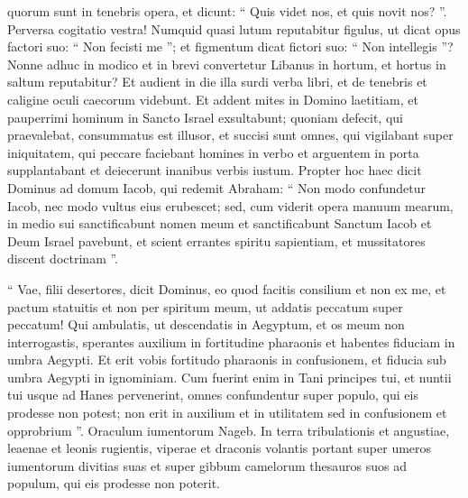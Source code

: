 \begin{biblechapter}
\begin{biblechapter}
\begin{biblechapter}
\begin{biblechapter}
\begin{biblechapter}
\begin{biblechapter}
\begin{biblechapter}
\begin{biblechapter}
\begin{biblechapter}
\begin{biblechapter}
\begin{biblechapter}
\begin{biblechapter}
\begin{biblechapter}
\begin{biblechapter}
\begin{biblechapter}
\begin{biblechapter}
\begin{biblechapter}
\begin{biblechapter}
\begin{biblechapter}
\begin{biblechapter}
\begin{biblechapter}
\begin{biblechapter}
\begin{biblechapter}
\begin{biblechapter}
\begin{biblechapter}
\begin{biblechapter}
\begin{biblechapter}
\begin{biblechapter}
\begin{biblechapter}
 quorum sunt in tenebris opera, et dicunt:
 “ Quis videt nos, et quis novit nos? ”.
 \verse Perversa cogitatio vestra!
 Numquid quasi lutum reputabitur figulus,
 ut dicat opus factori suo:
 “ Non fecisti me ”;
 et figmentum dicat fictori suo:
 “ Non intellegis ”?
 \verse Nonne adhuc in modico et in brevi convertetur Libanus in hortum,
 et hortus in saltum reputabitur?
 \verse Et audient in die illa surdi verba libri,
 et de tenebris et caligine oculi caecorum videbunt.
 \verse Et addent mites in Domino laetitiam,
 et pauperrimi hominum in Sancto Israel exsultabunt;
 \verse quoniam defecit, qui praevalebat,
 consummatus est illusor,
 et succisi sunt omnes, qui vigilabant super iniquitatem,
 \verse qui peccare faciebant homines in verbo
 et arguentem in porta supplantabant
 et deiecerunt inanibus verbis iustum.
 \verse Propter hoc haec dicit Dominus
 ad domum Iacob, qui redemit Abraham:
 “ Non modo confundetur Iacob,
 nec modo vultus eius erubescet;
 \verse sed, cum viderit opera manuum mearum,
 in medio sui sanctificabunt nomen meum
 et sanctificabunt Sanctum Iacob
 et Deum Israel pavebunt,
 \verse et scient errantes spiritu sapientiam,
 et mussitatores discent doctrinam ”.
  
\begin{biblechapter}
\verse “ Vae, filii desertores, dicit Dominus,
 eo quod facitis consilium et non ex me,
 et pactum statuitis et non per spiritum meum,
 ut addatis peccatum super peccatum!
 \verse Qui ambulatis, ut descendatis in Aegyptum,
 et os meum non interrogastis,
 sperantes auxilium in fortitudine pharaonis
 et habentes fiduciam in umbra Aegypti.
 \verse Et erit vobis fortitudo pharaonis in confusionem,
 et fiducia sub umbra Aegypti in ignominiam.
 \verse Cum fuerint enim in Tani principes tui,
 et nuntii tui usque ad Hanes pervenerint,
 \verse omnes confundentur
 super populo, qui eis prodesse non potest;
 non erit in auxilium et in utilitatem sed in confusionem et opprobrium ”. 
\verse Oraculum iumentorum Nageb.
 In terra tribulationis et angustiae,
 leaenae et leonis rugientis,
 viperae et draconis volantis
 portant super umeros iumentorum divitias suas
 et super gibbum camelorum thesauros suos
 ad populum, qui eis prodesse non poterit.

\end{biblechapter}
\end{biblechapter}
\end{biblechapter}
\end{biblechapter}
\end{biblechapter}
\end{biblechapter}
\end{biblechapter}
\end{biblechapter}
\end{biblechapter}
\end{biblechapter}
\end{biblechapter}
\end{biblechapter}
\end{biblechapter}
\end{biblechapter}
\end{biblechapter}
\end{biblechapter}
\end{biblechapter}
\end{biblechapter}
\end{biblechapter}
\end{biblechapter}
\end{biblechapter}
\end{biblechapter}
\end{biblechapter}
\end{biblechapter}
\end{biblechapter}
\end{biblechapter}
\end{biblechapter}
\end{biblechapter}
\end{biblechapter}
\end{biblechapter}
